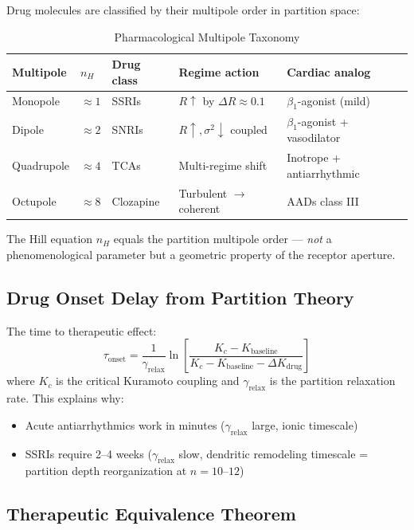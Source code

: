 \documentclass[12pt,a4paper]{article}
\theoremstyle{definition}
\begin{document}
Drug molecules are classified by their multipole order in partition space:

\begin{table}[H]
\centering
\caption{Pharmacological Multipole Taxonomy}
\label{tab:pharma}
\begin{tabular}{lllll}
\toprule
\textbf{Multipole} & \textbf{$n_H$} & \textbf{Drug class} & \textbf{Regime action} & \textbf{Cardiac analog}\\
\midrule
Monopole & $\approx 1$ & SSRIs & $R\uparrow$ by $\Delta R \approx 0.1$ & $\beta_1$-agonist (mild)\\
Dipole & $\approx 2$ & SNRIs & $R\uparrow, \sigma^2\downarrow$ coupled & $\beta_1$-agonist + vasodilator\\
Quadrupole & $\approx 4$ & TCAs & Multi-regime shift & Inotrope + antiarrhythmic\\
Octupole & $\approx 8$ & Clozapine & Turbulent $\to$ coherent & AADs class III\\
\bottomrule
\end{tabular}
\end{table}

The Hill equation $n_H$ equals the partition multipole order — \emph{not}
a phenomenological parameter but a geometric property of the receptor aperture.

\subsection{Drug Onset Delay from Partition Theory}

The time to therapeutic effect:
\begin{equation}
\tau_{\text{onset}} = \frac{1}{\gamma_{\text{relax}}} \ln\left[\frac{K_c - K_{\text{baseline}}}{K_c - K_{\text{baseline}} - \Delta K_{\text{drug}}}\right]
\end{equation}
where $K_c$ is the critical Kuramoto coupling and $\gamma_{\text{relax}}$
is the partition relaxation rate. This explains why:
\begin{itemize}
\item Acute antiarrhythmics work in minutes ($\gamma_{\text{relax}}$ large,
  ionic timescale)
\item SSRIs require 2--4 weeks ($\gamma_{\text{relax}}$ slow,
  dendritic remodeling timescale = partition depth reorganization at $n = 10$--$12$)
\end{itemize}

\subsection{Therapeutic Equivalence Theorem}
\end{document}
